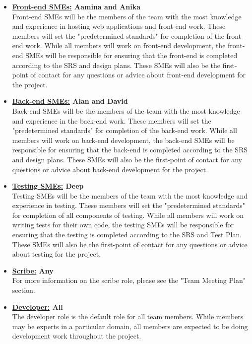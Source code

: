 \documentclass{article}
\begin{document}
\begin{itemize}
	\item \textbf{\underline{Front-end SMEs:} Aamina and Anika} \\
	Front-end SMEs will be the members of the team with the most knowledge and experience in hosting web applications and front-end work. 
	These members will set the "predetermined standards" for completion of the front-end work. 
	While all members will work on front-end development, the front-end SMEs will be responsible for ensuring that the front-end is completed according to the SRS and design plans. 
	These SMEs will also be the first-point of contact for any questions or advice about front-end development for the project.\\

	\item \textbf{\underline{Back-end SMEs:} Alan and David} \\
	Back-end SMEs will be the members of the team with the most knowledge and experience in the back-end work. 
	These members will set the "predetermined standards" for completion of the back-end work.
	While all members will work on back-end development, the back-end SMEs will be responsible for ensuring that the back-end is completed according to the SRS and design plans.
	These SMEs will also be the first-point of contact for any questions or advice about back-end development for the project.\\

	\item \textbf{\underline{Testing SMEs:} Deep} \\
	Testing SMEs will be the members of the team with the most knowledge and experience in testing.
	These members will set the "predetermined standards" for completion of all components of testing. 
	While all members will work on writing tests for their own code, the testing SMEs will be responsible for ensuring that the testing is completed according to the SRS and Test Plan. 
	These SMEs will also be the first-point of contact for any questions or advice about testing for the project.\\

	\item \textbf{\underline{Scribe:} Any} \\
	For more information on the scribe role, please see the "Team Meeting Plan" section.\\

	\item \textbf{\underline{Developer:} All} \\
	The developer role is the default role for all team members. 
	While members may be experts in a particular domain, all members are expected to be doing development work throughout the project. \\

\end{itemize}
\end{document}
